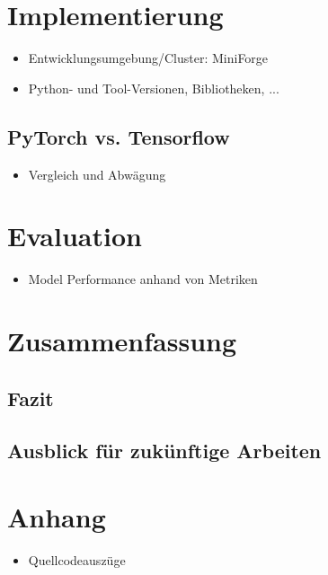 \documentclass{article}
\begin{document}
    \newpage
    \section{Implementierung}
    \begin{itemize}
        \item Entwicklungsumgebung/Cluster: MiniForge
        \item Python- und Tool-Versionen, Bibliotheken, ... %
    \end{itemize}
    \subsection{PyTorch vs. Tensorflow}
    \begin{itemize}
        \item Vergleich und Abwägung
    \end{itemize}
    \section{Evaluation}
    \begin{itemize}
        \item Model Performance anhand von Metriken
    \end{itemize}

    \section{Zusammenfassung}
    \subsection{Fazit}
    \subsection{Ausblick für zukünftige Arbeiten}

    
    

    \section*{Anhang}
    \begin{itemize}
        \item Quellcodeauszüge
    \end{itemize}
\end{document}
